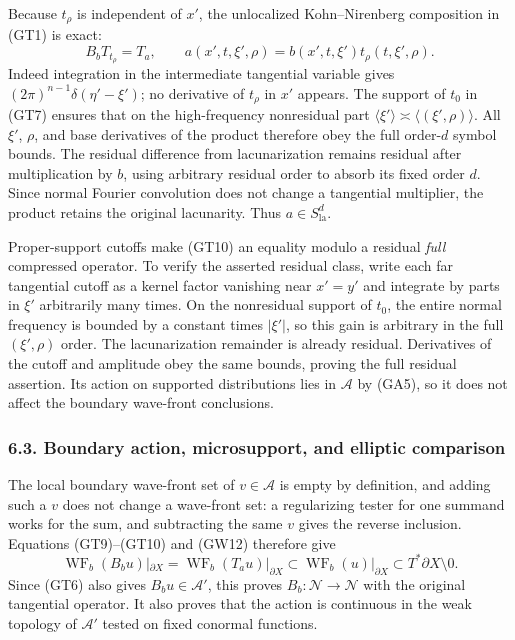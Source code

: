 \documentclass[
  11pt,
]{article}
\begin{document}
Because \(t_\rho\) is independent of \(x'\), the unlocalized
Kohn--Nirenberg composition in (GT1) is exact: \[
 B_bT_{t_\rho}=T_a,
 \qquad a(x',t,\xi',\rho)=b(x',t,\xi')t_\rho(t,\xi',\rho).
 \tag{GT10}
\] Indeed integration in the intermediate tangential variable gives
\((2\pi)^{n-1}\delta(\eta'-\xi')\); no derivative of \(t_\rho\) in
\(x'\) appears. The support of \(t_0\) in (GT7) ensures that on the
high-frequency nonresidual part
\(\langle\xi'\rangle\asymp\langle(\xi',\rho)\rangle\). All \(\xi'\),
\(\rho\), and base derivatives of the product therefore obey the full
order-\(d\) symbol bounds. The residual difference from lacunarization
remains residual after multiplication by \(b\), using arbitrary residual
order to absorb its fixed order \(d\). Since normal Fourier convolution
does not change a tangential multiplier, the product retains the
original lacunarity. Thus \(a\in S^d_{\mathrm{la}}\).

Proper-support cutoffs make (GT10) an equality modulo a residual
\emph{full} compressed operator. To verify the asserted residual class,
write each far tangential cutoff as a kernel factor vanishing near
\(x'=y'\) and integrate by parts in \(\xi'\) arbitrarily many times. On
the nonresidual support of \(t_0\), the entire normal frequency is
bounded by a constant times \(|\xi'|\), so this gain is arbitrary in the
full \((\xi',\rho)\) order. The lacunarization remainder is already
residual. Derivatives of the cutoff and amplitude obey the same bounds,
proving the full residual assertion. Its action on supported
distributions lies in \(\mathcal A\) by (GA5), so it does not affect the
boundary wave-front conclusions.

\subsubsection{6.3. Boundary action, microsupport, and elliptic
comparison}\label{boundary-action-microsupport-and-elliptic-comparison}

The local boundary wave-front set of \(v\in\mathcal A\) is empty by
definition, and adding such a \(v\) does not change a wave-front set: a
regularizing tester for one summand works for the sum, and subtracting
the same \(v\) gives the reverse inclusion. Equations (GT9)--(GT10) and
(GW12) therefore give \[
 \operatorname{WF}_b(B_bu)|_{\partial X}
   =\operatorname{WF}_b(T_au)|_{\partial X}
   \subset\operatorname{WF}_b(u)|_{\partial X}
   \subset T^*\partial X\setminus0.
 \tag{GT11}
\] Since (GT6) also gives \(B_bu\in\mathcal A'\), this proves
\(B_b:\mathcal N\to\mathcal N\) with the original tangential operator.
It also proves that the action is continuous in the weak topology of
\(\mathcal A'\) tested on fixed conormal functions.
\end{document}
